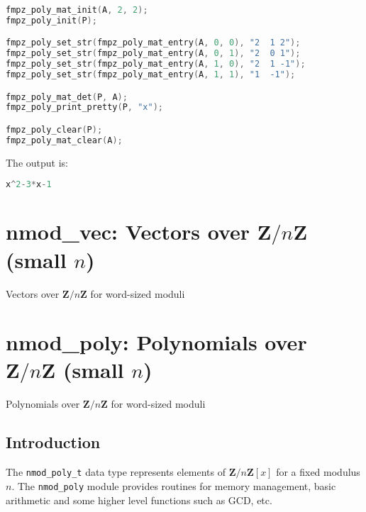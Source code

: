\documentclass[a4paper,10pt]{book}
\newcommand{\Z}{\mathbf{Z}}%
\newcommand{\code}{\lstinline}
\begin{document}
{{\begin{lstlisting}[language=c]
fmpz_poly_mat_init(A, 2, 2);
fmpz_poly_init(P);

fmpz_poly_set_str(fmpz_poly_mat_entry(A, 0, 0), "2  1 2");
fmpz_poly_set_str(fmpz_poly_mat_entry(A, 0, 1), "2  0 1");
fmpz_poly_set_str(fmpz_poly_mat_entry(A, 1, 0), "2  1 -1");
fmpz_poly_set_str(fmpz_poly_mat_entry(A, 1, 1), "1  -1");

fmpz_poly_mat_det(P, A);
fmpz_poly_print_pretty(P, "x");

fmpz_poly_clear(P);
fmpz_poly_mat_clear(A);
\end{lstlisting}

The output is:
\begin{lstlisting}[language=c]
x^2-3*x-1
\end{lstlisting}




\chapter{nmod\_vec: Vectors over $\Z/n\Z$ (small $n$)}
\epigraph{Vectors over $\Z / n \Z$ for word-sized moduli}{}




\chapter{nmod\_poly: Polynomials over $\Z/n\Z$ (small $n$)}
\epigraph{Polynomials over $\Z / n \Z$ for word-sized moduli}{}

\section{Introduction}

The \code{nmod_poly_t} data type represents elements of $\Z/n\Z[x]$ for
a fixed modulus $n$. The \code{nmod_poly} module provides routines for
memory management, basic arithmetic and some higher level functions
such as GCD, etc.

}}
\end{document}
